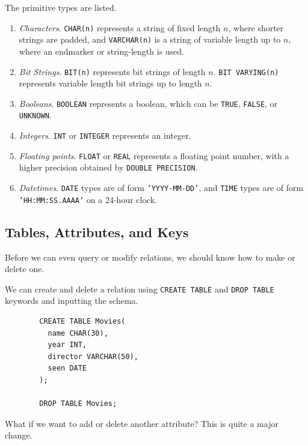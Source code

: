 \documentclass{article}
\begin{document}
  \begin{definition}
    The primitive types are listed. 
    \begin{enumerate}
      \item \textit{Characters}. \texttt{CHAR(n)} represents a string of fixed length $n$, where shorter strings are padded, and \texttt{VARCHAR(n)} is a string of variable length up to $n$, where an endmarker or string-length is used. 
      \item \textit{Bit Strings}. \texttt{BIT(n)} represents bit strings of length $n$. \texttt{BIT VARYING(n)} represents variable length bit strings up to length $n$. 
      \item \textit{Booleans}. \texttt{BOOLEAN} represents a boolean, which can be \texttt{TRUE}, \texttt{FALSE}, or \texttt{UNKNOWN}. 
      \item \textit{Integers}. \texttt{INT} or \texttt{INTEGER} represents an integer. 
      \item \textit{Floating points}. \texttt{FLOAT} or \texttt{REAL} represents a floating point number, with a higher precision obtained by \texttt{DOUBLE PRECISION}. 
      \item \textit{Datetimes}. \texttt{DATE} types are of form \texttt{'YYYY-MM-DD'}, and \texttt{TIME} types are of form \texttt{'HH:MM:SS.AAAA'} on a 24-hour clock. 
    \end{enumerate}
  \end{definition}

  \subsection{Tables, Attributes, and Keys}

    Before we can even query or modify relations, we should know how to make or delete one. 

    \begin{theorem}
      We can create and delete a relation using \texttt{CREATE TABLE} and \texttt{DROP TABLE} keywords and inputting the schema. 
      \begin{lstlisting}
        CREATE TABLE Movies(
          name CHAR(30), 
          year INT, 
          director VARCHAR(50), 
          seen DATE
        ); 

        DROP TABLE Movies; 
      \end{lstlisting}
    \end{theorem}

    What if we want to add or delete another attribute? This is quite a major change. 
\end{document}
